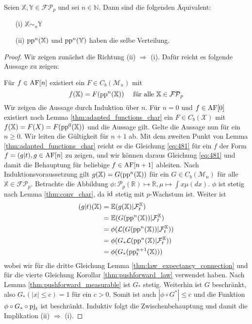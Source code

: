     \begin{lemma}\label{thm:equivalence_adapted_pp}
        Seien $\mathbb{X,Y} \in \mathcal{FP}_p$ und sei $n \in \mathbb{N}$. Dann sind die folgenden Äquivalent:
        \begin{enumerate}
            \item[(i)] $\mathbb{X} \sim_n \mathbb{Y}$
            \item[(ii)] $\operatorname{pp}^n(\mathbb{X})$ und $\operatorname{pp}^n(\mathbb{Y})$ haben die selbe Verteilung.
        \end{enumerate}
    \end{lemma}
    \begin{proof}
        Wir zeigen zunächst die Richtung (ii) $\Rightarrow$ (i). Dafür reicht es folgende Aussage zu zeigen:

        Für $f \in \operatorname{AF}[n]$ existiert ein $F \in C_b(\mathcal{M}_n)$ mit 
        \begin{equation}\label{eq:481}
            f(\mathbb{X}) = F(\operatorname{pp}^n(\mathbb{X})) \quad \text{ für alle } \mathbb{X} \in \mathcal{FP}_p
        \end{equation}
        Wir zeigen die Aussage durch Induktion über $n$. Für $n=0$ und $f \in \operatorname{AF}[0]$ existiert nach Lemma \ref{thm:adapted_functions_char} ein $F \in C_b(\mathcal{X})$ mit $f(\mathbb{X})=F(X)=F(\operatorname{pp}^0(\mathbb{X}))$ und die Aussage gilt. Gelte die Aussage nun für ein $n\geq 0$. Wir leiten die Gültigkeit für $n+1$ ab. Mit dem zweiten Punkt von Lemma \ref{thm:adapted_functions_char} reicht es die Gleichung \ref{eq:481} für ein $f$ der Form $f=(g\vert t), g\in \operatorname{AF}[n]$ zu zeigen, und wir können daraus Gleichung \ref{eq:481} und damit die Behauptung für beliebige $f \in \operatorname{AF}[n+1]$ ableiten. Nach Induktionsvoraussetzung gilt $g(\mathbb{X}) = G(\operatorname{pp}^n(\mathbb{X}))$ für ein $G \in C_b(\mathcal{M}_n)$ für alle $\mathbb{X}\in\mathcal{FP}_p$. Betrachte die Abbildung $\phi: \mathcal{P}_p(\mathbb{R}) \mapsto \mathbb{R}, \mu \mapsto \int x\mu(dx)$. $\phi$ ist stetig nach Lemma \ref{thm:conv_char}, da $\operatorname{id}$ stetig mit $p$-Wachstum ist. Weiter ist 
        \begin{align*}
            (g\vert t)(\mathbb{X}) &= \mathbb{E}(g(\mathbb{X}) \vert \mathcal{F}_t^\mathbb{X}) \\
            &= \mathbb{E}(G(\operatorname{pp}^n(\mathbb{X})) \vert \mathcal{F}_t^\mathbb{X}) \\
            &= \phi(\mathcal{L}(G(\operatorname{pp}^n(\mathbb{X})) \vert \mathcal{F}_t^\mathbb{X})) \\
            &= \phi(G_*\mathcal{L}(\operatorname{pp}^n(\mathbb{X}) \vert \mathcal{F}_t^\mathbb{X})) \\
            &= \phi(G_*(\operatorname{pp}^{n+1}_t(\mathbb{X})))
        \end{align*}
        wobei wir für die dritte Gleichung Lemma \ref{thm:law_expectancy_connection} und für die vierte Gleichung Korollar \ref{thm:pushforward_law} verwendet haben. Nach Lemma \ref{thm:pushforward_measurable} ist $G_*$ stetig. Weiterhin ist $G$ beschränkt, also $G_*(|x| \leq c)=1$ für ein $c>0$. Somit ist auch $|\phi\circ G^*| \leq c$ und die Funktion $\phi \circ G_* \circ \operatorname{pj}_t$ ist beschränkt. Induktiv folgt die Zwischenbehauptung und damit die Implikation (ii) $\Rightarrow$ (i).


\end{proof}
